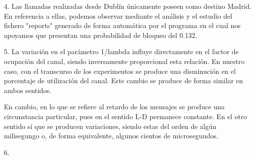 4.
Las llamadas realizadas desde Dublín únicamente poseen como destino Madrid. En referencia a ellas, podemos observar mediante el análisis y el estudio del fichero "reports" generado de forma automática por el programa en el cual nos apoyamos que presentan una probabilidad de bloqueo del 0.132.

5.
La variación en el parámetro 1/lambda influye directamente en el factor de ocupación del canal, siendo inversamente proporcional esta relación. En nuestro caso, con el transcurso de los experimentos se produce una disminución en el porcentaje de utilización del canal. Este cambio se produce de forma similar en ambos sentidos.

En cambio, en lo que se refiere al retardo de los mensajes se produce una circunstancia particular, pues en el sentido L-D permanece constante. En el otro sentido sí que se producen variaciones, siendo estas del orden de algún milisegungo o, de forma equivalente, algunos cientos de microsegundos.

6.
